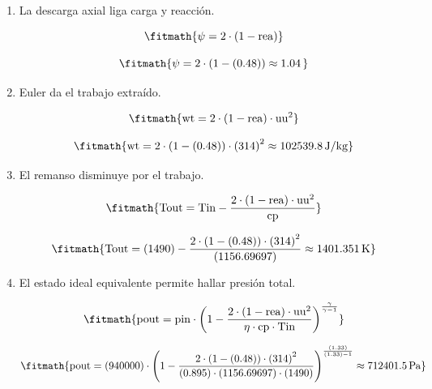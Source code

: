 \begin{enumerate}

\item La descarga axial liga carga y reacción.

\[\fitmath{\psi=2\cdot \left(1-\mathrm{rea}\right)}\]

\[\fitmath{\psi=2\cdot \left(1-(0.48)\right)\approx 1.04\,}\]

\item Euler da el trabajo extraído.

\[\fitmath{\mathrm{wt}=2\cdot \left(1-\mathrm{rea}\right)\cdot {\mathrm{uu}}^{2}}\]

\[\fitmath{\mathrm{wt}=2\cdot \left(1-(0.48)\right)\cdot {(314)}^{2}\approx 102539.8\,\mathrm{J/kg}}\]

\item El remanso disminuye por el trabajo.

\[\fitmath{\mathrm{Tout}=\mathrm{Tin}-\frac{2\cdot \left(1-\mathrm{rea}\right)\cdot {\mathrm{uu}}^{2}}{\mathrm{cp}}}\]

\[\fitmath{\mathrm{Tout}=(1490)-\frac{2\cdot \left(1-(0.48)\right)\cdot {(314)}^{2}}{(1156.69697)}\approx 1401.351\,\mathrm{K}}\]

\item El estado ideal equivalente permite hallar presión total.

\[\fitmath{\mathrm{pout}=\mathrm{pin}\cdot {\left(1-\frac{2\cdot \left(1-\mathrm{rea}\right)\cdot {\mathrm{uu}}^{2}}{\eta\cdot \mathrm{cp}\cdot \mathrm{Tin}}\right)}^{\frac{\gamma}{\gamma-1}}}\]

\[\fitmath{\mathrm{pout}=(940000)\cdot {\left(1-\frac{2\cdot \left(1-(0.48)\right)\cdot {(314)}^{2}}{(0.895)\cdot (1156.69697)\cdot (1490)}\right)}^{\frac{(1.33)}{(1.33)-1}}\approx 712401.5\,\mathrm{Pa}}\]

\end{enumerate}
